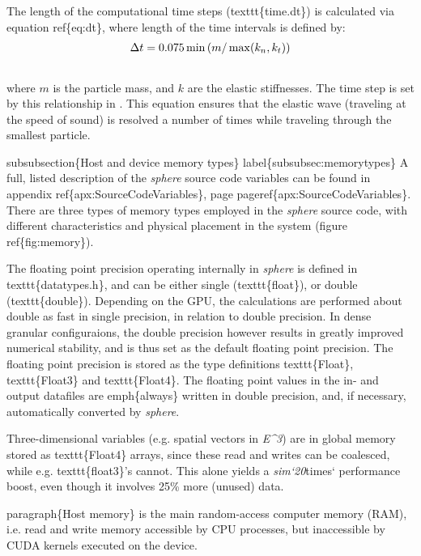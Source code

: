 \documentclass[letterpaper,10pt,english]{sphinxmanual}
\begin{document}
The length of the computational time steps (texttt\{time.dt\}) is calculated via equation ref\{eq:dt\}, where length of the time intervals is defined by:
\begin{gather}
\begin{split}\Delta t = 0.075 \min \left( m/\max(k_n,k_t) \right)\end{split}\notag\\\begin{split}\end{split}\notag
\end{gather}
where $m$ is the particle mass, and $k$ are the elastic stiffnesses.
The time step is set by this relationship in .
This equation ensures that the elastic wave (traveling at the speed of sound) is resolved a number of times while traveling through the smallest particle.

subsubsection\{Host and device memory types\}
label\{subsubsec:memorytypes\}
A full, listed description of the \emph{sphere} source code variables can be found in appendix ref\{apx:SourceCodeVariables\}, page pageref\{apx:SourceCodeVariables\}. There are three types of memory types employed in the \emph{sphere} source code, with different characteristics and physical placement in the system (figure ref\{fig:memory\}).

The floating point precision operating internally in \emph{sphere} is defined in texttt\{datatypes.h\}, and can be either single (texttt\{float\}), or double (texttt\{double\}). Depending on the GPU, the calculations are performed about double as fast in single precision, in relation to double precision. In dense granular configuraions, the double precision however results in greatly improved numerical stability, and is thus set as the default floating point precision. The floating point precision is stored as the type definitions texttt\{Float\}, texttt\{Float3\} and texttt\{Float4\}. The floating point values in the in- and output datafiles are emph\{always\} written in double precision, and, if necessary, automatically converted by \emph{sphere}.

Three-dimensional variables (e.g. spatial vectors in \emph{E\textasciicircum{}3}) are in global memory stored as texttt\{Float4\} arrays, since these read and writes can be coalesced, while e.g. texttt\{float3\}'s cannot. This alone yields a \emph{sim{}`20}times{}` performance boost, even though it involves 25\% more (unused) data.

paragraph\{Host memory\} is the main random-access computer memory (RAM), i.e. read and write memory accessible by CPU processes, but inaccessible by CUDA kernels executed on the device.
\end{document}
